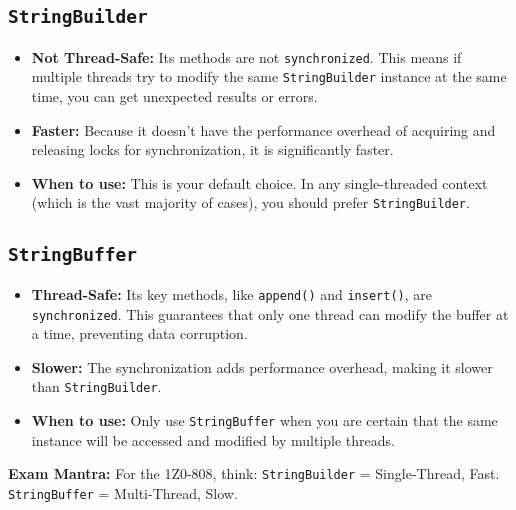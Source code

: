 \documentclass[12pt]{article}
\begin{document}
\begin{enumerate}[label=(\arabic*)]
\subsection*{\texttt{StringBuilder}}
\begin{itemize}
    \item \textbf{Not Thread-Safe:} Its methods are not \texttt{synchronized}. This means if multiple threads try to modify the same \texttt{StringBuilder} instance at the same time, you can get unexpected results or errors.
    \item \textbf{Faster:} Because it doesn't have the performance overhead of acquiring and releasing locks for synchronization, it is significantly faster.
    \item \textbf{When to use:} This is your default choice. In any single-threaded context (which is the vast majority of cases), you should prefer \texttt{StringBuilder}.
\end{itemize}

\subsection*{\texttt{StringBuffer}}
\begin{itemize}
    \item \textbf{Thread-Safe:} Its key methods, like \texttt{append()} and \texttt{insert()}, are \texttt{synchronized}. This guarantees that only one thread can modify the buffer at a time, preventing data corruption.
    \item \textbf{Slower:} The synchronization adds performance overhead, making it slower than \texttt{StringBuilder}.
    \item \textbf{When to use:} Only use \texttt{StringBuffer} when you are certain that the same instance will be accessed and modified by multiple threads.
\end{itemize}

\textbf{Exam Mantra:} For the 1Z0-808, think: \texttt{StringBuilder} = Single-Thread, Fast. \texttt{StringBuffer} = Multi-Thread, Slow.


\end{enumerate}
\end{document}
